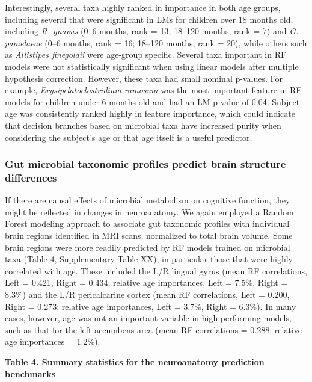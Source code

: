 \documentclass{article}
\begin{document}
Interestingly, several taxa highly ranked in importance in both age
groups, including several that were significant in LMs for children over
18 months old, including \emph{R. gnavus} (0--6 months, rank = 13;
18--120 months, rank = 7) and \emph{G. pamelaeae} (0--6 months, rank =
16; 18--120 months, rank = 20), while others such as \emph{Allistipes
finegoldii} were age-group specific. Several taxa important in RF models
were not statistically significant when using linear models after
multiple hypothesis correction. However, these taxa had small nominal
p-values. For example, \emph{Erysipelatoclostridium ramosum} was the
most important feature in RF models for children under 6 months old and
had an LM p-value of 0.04. Subject age was consistently ranked highly in
feature importance, which could indicate that decision branches based on
microbial taxa have increased purity when considering the subject's age
or that age itself is a useful predictor.

\subsubsection*{Gut microbial taxonomic profiles predict brain structure differences}

If there are causal effects of microbial metabolism on cognitive
function, they might be reflected in changes in neuroanatomy. We again
employed a Random Forest modeling approach to associate gut taxonomic
profiles with individual brain regions identified in MRI scans,
normalized to total brain volume. Some brain regions were more readily
predicted by RF models trained on microbial taxa (Table 4, Supplementary
Table XX), in particular those that were highly correlated with age.
These included the L/R lingual gyrus (mean RF correlations, Left =
0.421, Right = 0.434; relative age importances, Left = 7.5\%, Right =
8.3\%) and the L/R pericalcarine cortex (mean RF correlations, Left =
0.200, Right = 0.273; relative age importances, Left = 3.7\%, Right =
6.3\%). In many cases, however, age was not an important variable in
high-performing models, such as that for the left accumbens area (mean
RF correlations = 0.288; relative age importances = 1.2\%).

\textbf{Table 4. Summary statistics for the neuroanatomy prediction benchmarks}
\end{document}
